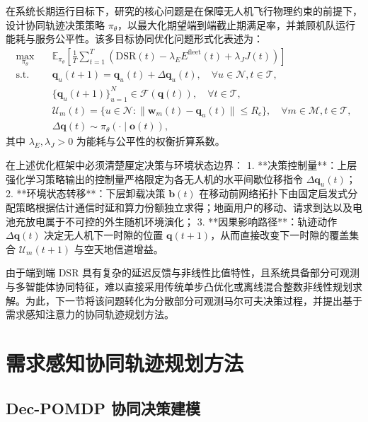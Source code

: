 在系统长期运行目标下，研究的核心问题是在保障无人机飞行物理约束的前提下，设计协同轨迹决策策略 $\pi_\theta$，以最大化期望端到端截止期满足率，并兼顾机队运行能耗与服务公平性。该多目标协同优化问题形式化表述为：
\begin{equation}
    \begin{aligned}
    \max_{\pi_\theta}\quad & \mathbb E_{\pi_\theta}\left[\frac{1}{T}\sum_{t=1}^T \left(\mathrm{DSR}(t) - \lambda_E E^{\mathrm{fleet}}(t) + \lambda_J J(t)\right)\right] \\
    \text{s.t.}\quad 
    & \mathbf q_u(t+1) = \mathbf q_u(t) + \Delta\mathbf q_u(t), \quad \forall u\in\mathcal N, t\in\mathcal T,\\
    & \{\mathbf q_u(t+1)\}_{u=1}^N \in \mathcal F(\mathbf q(t)), \quad \forall t\in\mathcal T,\\
    & \mathcal U_m(t) = \{u\in\mathcal N: \|\mathbf w_m(t) - \mathbf q_u(t)\| \leq R_c\}, \quad \forall m\in\mathcal M, t\in\mathcal T,\\
    & \Delta\mathbf q(t) \sim \pi_\theta(\cdot \mid \mathbf o(t)),
    \end{aligned}
    \label{eq:ch3-problem-formulation}
\end{equation}
其中 $\lambda_E, \lambda_J > 0$ 为能耗与公平性的权衡折算系数。

在上述优化框架中必须清楚厘定决策与环境状态边界：
1. **决策控制量**：上层强化学习策略输出的控制量严格限定为各无人机的水平间歇位移指令 $\Delta\mathbf q_u(t)$；
2. **环境状态转移**：下层卸载决策 $\mathbf b(t)$ 在移动前网络拓扑下由固定启发式分配策略根据估计通信时延和算力份额独立求得；地面用户的移动、请求到达以及电池充放电属于不可控的外生随机环境演化；
3. **因果影响路径**：轨迹动作 $\Delta\mathbf q(t)$ 决定无人机下一时隙的位置 $\mathbf q(t+1)$，从而直接改变下一时隙的覆盖集合 $\mathcal U_m(t+1)$ 与空天地信道增益。

由于端到端 DSR 具有复杂的延迟反馈与非线性比值特性，且系统具备部分可观测与多智能体协同特征，难以直接采用传统单步凸优化或离线混合整数非线性规划求解。为此，下一节将该问题转化为分散部分可观测马尔可夫决策过程，并提出基于需求感知注意力的协同轨迹规划方法。

\section{需求感知协同轨迹规划方法}
\label{sec:upper-dec-pomdp}

\subsection{Dec-POMDP 协同决策建模}
\label{sec:dec-pomdp-motivation}
\label{sec:upper-reward}

